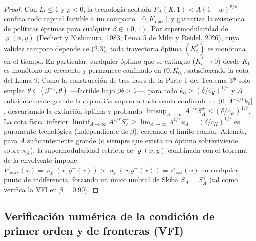 \documentclass[11pt,letterpaper]{article}
\theoremstyle{plain}
\begin{document}
\begin{proof}
Con $L_t\le 1$ y $\rho<0$, la tecnología acotada $F_A(K,1) < A(1-w)^{\theta/\rho}$ confina todo capital factible a un compacto $[0,K_{\max}]$ y garantiza la existencia de políticas óptimas para cualquier $\beta\in(0,1)$. Por supermodularidad de $\varrho(x,y)$ (Dechert y Nishimura, 1983; Lema 5 de Milei y Reidel, 2026), cuya validez tampoco depende de (2.3), toda trayectoria óptima $(K_t^*)$ es monótona en el tiempo. En particular, cualquier óptimo que se extingue ($K_t^*\to 0$) desde $K_0$ es monótono no creciente y permanece confinado en $(0,K_0]$, satisfaciendo la cota del Lema 9. Como la construcción de tres fases de la Parte 1 del Teorema 3* solo emplea $\tilde{\theta}\in(\beta^{-1},\theta)$ ---factible bajo $\beta\theta>1$---, para todo $k_0 > (\delta/c_K)^{1/r}$ y $A$ suficientemente grande la expansión supera a toda senda confinada en $(0, A^{-1/r}k_0]$, descartando la extinción óptima y probando $\limsup_{A\to\infty} A^{1/r} S_A^+ \le (\delta/c_K)^{1/r}$. La cota física inferior $\liminf_{A\to\infty} A^{1/r} S_A^- \ge \lim_{A\to\infty} A^{1/r}\kappa_A = (\delta/c_K)^{1/r}$ es puramente tecnológica (independiente de $\beta$), cerrando el límite común. Además, para $A$ suficientemente grande (o siempre que exista un óptimo sobreviviente sobre $\kappa_A$), la supermodularidad estricta de $\varrho(x,y)$ combinada con el teorema de la envolvente impone $V'_{\mathrm{surv}}(x)=\varrho_x(x,g^+(x))>\varrho_x(x,g^-(x))=V'_{\mathrm{ext}}(x)$ en cualquier punto de indiferencia, forzando un único umbral de Skiba $S_A^-=S_A^+$ (tal como verifica la VFI en $\beta=0.90$).
\end{proof}

\subsection{Verificación numérica de la condición de primer orden y de fronteras (VFI)}
\end{document}

